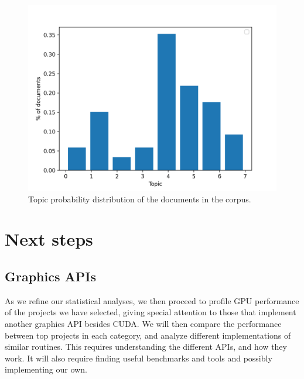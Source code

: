 \documentclass[12pt]{article}
\begin{document}
\begin{figure}[ht]
    \centering
    \includegraphics[width=0.7\linewidth]{topic-probabilities.png}
    \caption{Topic probability distribution of the documents in the corpus.}
    \label{fig:topic-probabilities}
\end{figure}

\section{Next steps} \label{sec:next-steps}

\subsection{Graphics APIs} \label{sec:next-steps-apis}

As we refine our statistical analyses, we then proceed to profile GPU performance of the
projects we have selected, giving special attention to those that implement
another graphics API besides CUDA.
We will then compare the performance between top projects in each category, and
analyze different implementations of similar routines.
This requires understanding the different APIs, and how they work.
It will also require finding useful benchmarks and tools and possibly
implementing our own.



\end{document}
